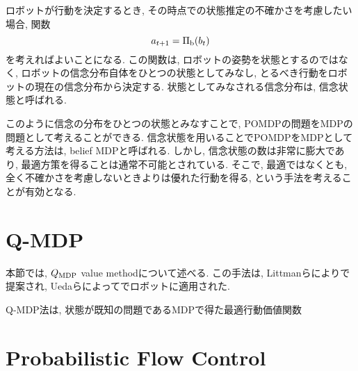 ロボットが行動を決定するとき, その時点での状態推定の不確かさを考慮したい場合, 関数
\begin{equation}
\label{policy belief}
  a_{t+1} = \Pi_{\rm b} (b_{t})
\end{equation}
を考えればよいことになる. 
この関数は, ロボットの姿勢を状態とするのではなく, ロボットの信念分布自体をひとつの状態としてみなし, 
とるべき行動をロボットの現在の信念分布から決定する. 
状態としてみなされる信念分布は, 信念状態と呼ばれる. 

このように信念の分布をひとつの状態とみなすことで, POMDPの問題をMDPの問題として考えることができる. 
信念状態を用いることでPOMDPをMDPとして考える方法は, belief MDPと呼ばれる\cite{kaelbling1998}. 
しかし, 信念状態の数は非常に膨大であり, 最適方策を得ることは通常不可能とされている. 
そこで, 最適ではなくとも, 全く不確かさを考慮しないときよりは優れた行動を得る, という手法を考えることが有効となる. 


\section{Q-MDP} \label{section:q-mdp}
本節では, $Q_{\rm MDP}$ value methodについて述べる. 
この手法は, Littmanらにより\cite{littman1995}で提案され, Uedaらによって\cite{}でロボットに適用された. 

Q-MDP法は, 状態が既知の問題であるMDPで得た最適行動価値関数


\section{Probabilistic Flow Control} \label{section:PFC法}
